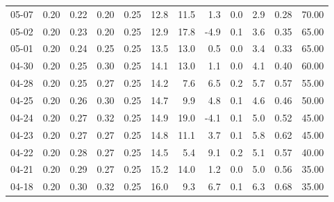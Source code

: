 \begin{threeparttable}
{\begin{tabular}{lrrrrrrrrrrr}
  05-07 &          0.20 &          0.22 &          0.20 &        0.25 &                12.8 &                11.5 &        1.3 &                 0.0 &              2.9 &            0.28 &                  70.00 \\
  05-02 &          0.20 &          0.23 &          0.20 &        0.25 &                12.9 &                17.8 &       -4.9 &                 0.1 &              3.6 &            0.35 &                  65.00 \\
  05-01 &          0.20 &          0.24 &          0.25 &        0.25 &                13.5 &                13.0 &        0.5 &                 0.0 &              3.4 &            0.33 &                  65.00 \\
  04-30 &          0.20 &          0.25 &          0.30 &        0.25 &                14.1 &                13.0 &        1.1 &                 0.0 &              4.1 &            0.40 &                  60.00 \\
  04-28 &          0.20 &          0.25 &          0.27 &        0.25 &                14.2 &                 7.6 &        6.5 &                 0.2 &              5.7 &            0.57 &                  55.00 \\
  04-25 &          0.20 &          0.26 &          0.30 &        0.25 &                14.7 &                 9.9 &        4.8 &                 0.1 &              4.6 &            0.46 &                  50.00 \\
  04-24 &          0.20 &          0.27 &          0.32 &        0.25 &                14.9 &                19.0 &       -4.1 &                 0.1 &              5.0 &            0.52 &                  45.00 \\
  04-23 &          0.20 &          0.27 &          0.27 &        0.25 &                14.8 &                11.1 &        3.7 &                 0.1 &              5.8 &            0.62 &                  45.00 \\
  04-22 &          0.20 &          0.28 &          0.27 &        0.25 &                14.5 &                 5.4 &        9.1 &                 0.2 &              5.1 &            0.57 &                  40.00 \\
  04-21 &          0.20 &          0.29 &          0.27 &        0.25 &                15.2 &                14.0 &        1.2 &                 0.0 &              5.0 &            0.56 &                  35.00 \\
  04-18 &          0.20 &          0.30 &          0.32 &        0.25 &                16.0 &                 9.3 &        6.7 &                 0.1 &              6.3 &            0.68 &                  35.00 \\

\end{tabular}}
\end{threeparttable}
